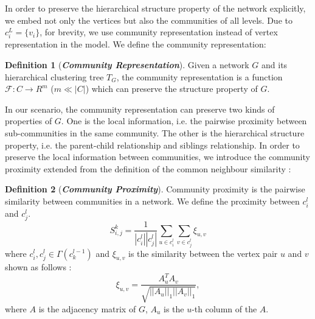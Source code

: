 \documentclass{article}
\theoremstyle{definition}
\newtheorem{defn}{Definition}
\newcommand{\origin}[1]{{\color{blue}{#1}}}
\begin{document}
		In order to preserve the hierarchical structure property of the network explicitly, we embed not only the vertices but also the communities of all levels. Due to $c_i^L = \{v_i\}$, 
		for brevity, we use community representation instead of vertex representation in the model. We define the community representation:
		\begin{defn}[\textbf{\emph{Community Representation}}]
			Given a network $G$ and its hierarchical clustering tree $T_G$, the community representation is a function $\mathcal{F}: C \rightarrow R^m$ ($m \ll |C|$) which can preserve the structure property of $G$.
		\end{defn} 
	    In our scenario, the community representation can preserve two kinds of properties of $G$. One is the local information, i.e. the pairwise proximity between sub-communities in the same community.
	    The other is the hierarchical structure property, i.e. the parent-child relationship and siblings relationship.
	    In order to preserve the local information between communities, we introduce the community proximity extended from the definition of the common neighbour similarity \cite{libennowell2007the}:
	    \begin{defn}[\textbf{\emph{Community Proximity}}]
			Community proximity is the pairwise similarity between communities in a network. 
			We define the proximity between $c^l_i$ and $c^l_j$.
			\begin{equation}
			S_{i,j}^k = \frac{1}{|c_i^l||c_j^l|}\sum_{u \in c_i^l} \sum_{v \in c_j^l} \xi_{u, v}
			\end{equation} 
			where $c_i^l, c_j^l \in \Gamma(c_k^{l-1})$
			and $\xi_{u, v}$ is the similarity between the vertex pair $u$ and $v$ shown as follows :
			\begin{equation}
			\xi_{u,v} = \frac{A_u^TA_v}{\sqrt{||A_u||_1||A_v||_1}},
			\end{equation}
			where $A$ is the adjacency matrix of $G$, $A_u$ is the $u$-th column of the $A$.	
		\end{defn}
\end{document}
